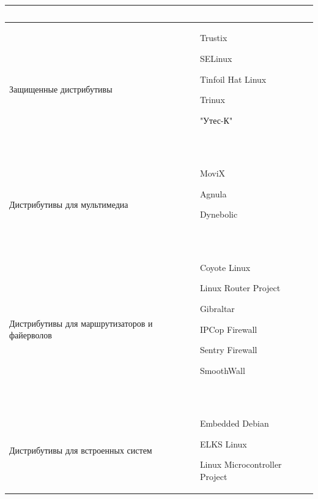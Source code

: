 \documentclass[bachelor, och, pract, times]{SCWorks}
\begin{document}
\begin{longtable}{|p{}|p{}|}
\begin{minipage}{\textwidth}
        ~
    \end{minipage}
    \\\hline
    Защищенные дистрибутивы &
    \begin{minipage}{\textwidth}
        \begin{list}{•}{~}
            \item Trustix
            \item SELinux
            \item Tinfoil Hat Linux
            \item Trinux
            \item "Утес-К"
        \end{list}
        ~
    \end{minipage}
    \\\hline
    Дистрибутивы для мультимедиа &
    \begin{minipage}{\textwidth}
        \begin{list}{•}{~}
            \item MoviX
            \item Agnula
            \item Dynebolic
        \end{list}
        ~
    \end{minipage}
    \\\hline
    Дистрибутивы для маршрутизаторов и файерволов &
    \begin{minipage}{\textwidth}
        \begin{list}{•}{~}
            \item Coyote Linux
            \item Linux Router Project
            \item Gibraltar
            \item IPCop Firewall
            \item Sentry Firewall
            \item SmoothWall
        \end{list}
        ~
    \end{minipage}
    \\\hline
    Дистрибутивы для встроенных систем &
    \begin{minipage}{\textwidth}
        \begin{list}{•}{~}
            \item Embedded Debian
            \item ELKS Linux
            \item Linux Microcontroller Project
        \end{list}

\end{minipage}
\end{longtable}
\end{document}
